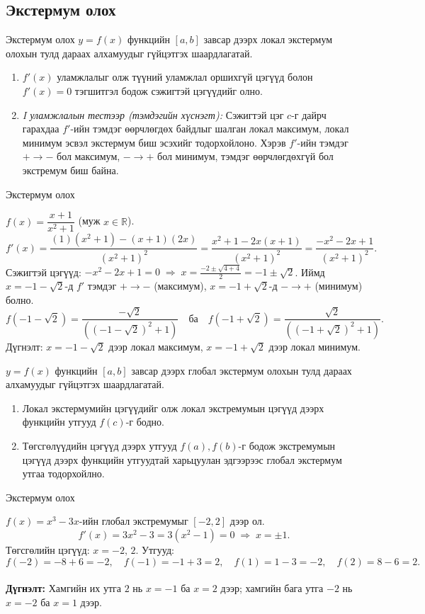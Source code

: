\subsection{Экстермум олох}
\begin{frame}[allowframebreaks]{Экстермум олох}
$y=f(x)$ функцийн $[a,b]$ завсар дээрх локал экстермум олохын тулд дараах алхамуудыг гүйцэтгэх шаардлагатай.
\begin{enumerate}
  \item $f'(x)$ уламжлалыг олж түүний уламжлал оршихгүй цэгүүд болон $f'(x)=0$ тэгшитгэл бодож сэжигтэй цэгүүдийг олно. 
  \item \textit{I уламжлалын тестээр (тэмдэгийн хүснэгт):} Сэжигтэй цэг $c$-г дайрч гарахдаа $f'$-ийн тэмдэг өөрчлөгдөх байдлыг шалган локал максимум, локал минимум эсвэл экстермум биш эсэхийг тодорхойлоно. Хэрэв  $f'$-ийн тэмдэг $+\to -$ бол максимум, $-\to +$ бол минимум, тэмдэг өөрчлөгдөхгүй бол экстремум биш байна.
\end{enumerate}  
\end{frame}

\begin{frame}[allowframebreaks]{Экстермум олох}
\begin{example}
$f(x)=\dfrac{x+1}{x^2+1}$ \quad (муж $x\in\mathbb{R}$).
\[
f'(x)=\frac{(1)(x^2+1)-(x+1)(2x)}{(x^2+1)^2}
=\frac{x^2+1-2x(x+1)}{(x^2+1)^2}
=\frac{-x^2-2x+1}{(x^2+1)^2}.
\]
Сэжигтэй цэгүүд: $-x^2-2x+1=0 \;\Rightarrow\; x=\frac{-2\pm\sqrt{4+4}}{2}=-1\pm\sqrt{2}$.
Иймд $x=-1-\sqrt2$-д $f'$ тэмдэг $+\to -$ (максимум), $x=-1+\sqrt2$-д $-\to +$ (минимум) болно.
\[
f(-1-\sqrt2)=\frac{-\sqrt2}{( (-1-\sqrt2)^2+1)} \quad\text{ба}\quad
f(-1+\sqrt2)=\frac{\sqrt2}{( (-1+\sqrt2)^2+1)}.
\]
Дүгнэлт: $x=-1-\sqrt2$ дээр локал максимум, $x=-1+\sqrt2$ дээр локал минимум.
\end{example}

$y=f(x)$ функцийн $[a,b]$ завсар дээрх глобал экстермум олохын тулд дараах алхамуудыг гүйцэтгэх шаардлагатай.
\begin{enumerate}
  \item Локал экстермумийн цэгүүдийг олж локал экстремумын цэгүүд дээрх функцийн утгууд $f(c)$-г бодно.
  \item Төгсгөлүүдийн цэгүүд дээрх утгууд $f(a), f(b)$-г бодож экстремумын цэгүүд дээрх функцийн утгуудтай харьцуулан эдгээрээс глобал экстермум утгаа тодорхойлно.
  \end{enumerate}  
\end{frame}

\begin{frame}[allowframebreaks]{Экстермум олох}
\begin{example}
$f(x)=x^3-3x$-ийн глобал экстремумыг $[-2,2]$ дээр ол.
\[
f'(x)=3x^2-3=3(x^2-1)=0 \;\Rightarrow\; x=\pm1.
\]
Төгсгөлийн цэгүүд: $x=-2,\,2$. Утгууд:
\[
f(-2)=-8+6=-2,\quad f(-1)=-1+3=2,\quad f(1)=1-3=-2,\quad f(2)=8-6=2.
\]\\
\textbf{Дүгнэлт:} Хамгийн их утга $2$ нь $x=-1$ ба $x=2$ дээр; хамгийн бага утга $-2$ нь $x=-2$ ба $x=1$ дээр.    
\end{example}
\end{frame}

